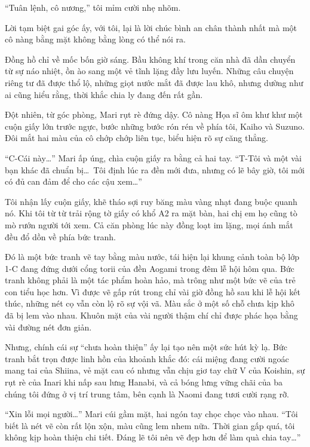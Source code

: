 \documentclass[../main.tex]{subfiles}
\begin{document}
``Tuân lệnh, cô nương,'' tôi mỉm cười nhẹ nhõm.

Lời tạm biệt gai góc ấy, với tôi, lại là lời chúc bình an chân thành nhất mà một cô nàng bằng mặt không bằng lòng có thể nói ra.

\ct

Đồng hồ chỉ về mốc bốn giờ sáng. Bầu không khí trong căn nhà đã dần chuyển từ sự náo nhiệt, ồn ào sang một vẻ tĩnh lặng đầy lưu luyến. Những câu chuyện riêng tư đã được thổ lộ, những giọt nước mắt đã được lau khô, nhưng dường như ai cũng hiểu rằng, thời khắc chia ly đang đến rất gần.

Đột nhiên, từ góc phòng, Mari rụt rè đứng dậy. Cô nàng Họa sĩ ôm khư khư một cuộn giấy lớn trước ngực, bước những bước rón rén về phía tôi, Kaiho và Suzuno. Đôi mắt hai màu của cô chớp chớp liên tục, biểu hiện rõ sự căng thẳng.

``C-Cái này\dots'' Mari ấp úng, chìa cuộn giấy ra bằng cả hai tay. ``T-Tôi và một vài bạn khác đã chuẩn bị\dots\ Tôi định lúc ra đền mới đưa, nhưng có lẽ bây giờ, tôi mới có đủ can đảm để cho các cậu xem\dots''

Tôi nhận lấy cuộn giấy, khẽ tháo sợi ruy băng màu vàng nhạt đang buộc quanh nó. Khi tôi từ từ trải rộng tờ giấy có khổ A2 ra mặt bàn, hai chị em họ cũng tò mò rướn người tới xem. Cả căn phòng lúc này đồng loạt im lặng, mọi ánh mắt đều đổ dồn về phía bức tranh.

Đó là một bức tranh vẽ tay bằng màu nước, tái hiện lại khung cảnh toàn bộ lớp 1-C đang đứng dưới cổng torii của đền Aogami trong đêm lễ hội hôm qua. Bức tranh không phải là một tác phẩm hoàn hảo, mà trông như một bức vẽ của trẻ con tiểu học hơn. Vì được vẽ gấp rút trong chỉ vài giờ đồng hồ sau khi lễ hội kết thúc, những nét cọ vẫn còn lộ rõ sự vội vã. Màu sắc ở một số chỗ chưa kịp khô đã bị lem vào nhau. Khuôn mặt của vài người thậm chí chỉ được phác họa bằng vài đường nét đơn giản.

Nhưng, chính cái sự ``chưa hoàn thiện'' ấy lại tạo nên một sức hút kỳ lạ. Bức tranh bắt trọn được linh hồn của khoảnh khắc đó: cái miệng đang cười ngoác mang tai của Shiina, vẻ mặt cau có nhưng vẫn chịu giơ tay chữ V của Koishin, sự rụt rè của Inari khi nấp sau lưng Hanabi, và cả bóng lưng vững chãi của ba chúng tôi đứng ở vị trí trung tâm, bên cạnh là Naomi đang tươi cười rạng rỡ.

``Xin lỗi mọi người\dots'' Mari cúi gầm mặt, hai ngón tay chọc chọc vào nhau. ``Tôi biết là nét vẽ còn rất lộn xộn, màu cũng lem nhem nữa. Thời gian gấp quá, tôi không kịp hoàn thiện chi tiết. Đáng lẽ tôi nên vẽ đẹp hơn để làm quà chia tay\dots''
\end{document}
